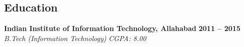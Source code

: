 \documentclass[margin,line]{resume}
\newcounter{dateone}
\newcounter{datetwo}
\newcommand{\difftoday}[3]{%
      \setmydatenumber{dateone}{\the\year}{\the\month}{\the\day}%
      \setmydatenumber{datetwo}{#1}{#2}{#3}%
      \addtocounter{datetwo}{-\thedateone}%
      \the\numexpr-\thedatetwo/365\relax\space year(s),
      \the\numexpr(-\thedatetwo - (-\thedatetwo/365)*365)/30\relax\space month(s)
}
\begin{document}
  \address{mobile: +91-8826567807 \\ email: hp.iiita@gmail.com}
\begin{resume}



    \section{\mysidestyle Education}

    \textbf{Indian Institute of Information Technology, Allahabad} \hfill \textbf{2011 -- 2015}\vspace{0mm}\\\vspace{0mm}%
    \textsl{B.Tech (Information Technology)} \hfill \textsl{CGPA: 8.00}


\end{resume}
\end{document}

